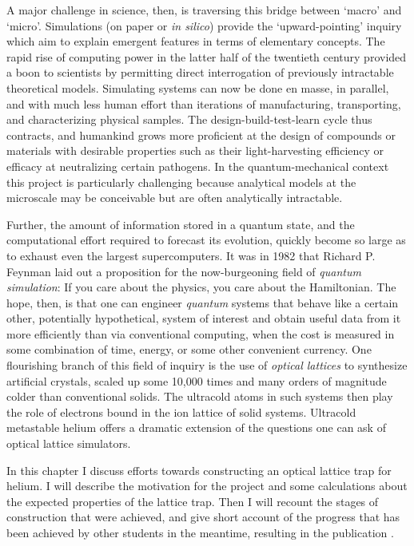 	A major challenge in science, then, is traversing this bridge between `macro' and `micro'.
	Simulations (on paper or \emph{in silico}) provide the `upward-pointing' inquiry which aim to explain emergent features in terms of elementary concepts.
	The rapid rise of computing power in the latter half of the twentieth century provided a boon to scientists by permitting direct interrogation of previously intractable theoretical models.
	Simulating systems can now be done en masse, in parallel, and with much less human effort than iterations of manufacturing, transporting, and characterizing physical samples.
	The design-build-test-learn cycle thus contracts, and humankind grows more proficient at the design of compounds or materials with desirable properties such as their light-harvesting efficiency or efficacy at neutralizing certain pathogens.
	In the quantum-mechanical context this project is particularly challenging because analytical models at the microscale may be conceivable but are often analytically intractable.
	
	Further, the amount of information stored in a quantum state, and the computational effort required to forecast its evolution, quickly become so large as to exhaust even the largest supercomputers.
	It was in 1982 that Richard P.
	Feynman laid out a proposition for the now-burgeoning field of \emph{quantum simulation}:
	If you care about the physics, you care about the Hamiltonian.
	The hope, then, is that one can engineer \emph{quantum} systems that behave like a certain other, potentially hypothetical, system of interest and obtain useful data from it more efficiently than via conventional computing, when the cost is measured in some combination of time, energy, or some other convenient currency.
	One flourishing branch of this field of inquiry is the use of \emph{optical lattices} to synthesize artificial crystals, scaled up some 10,000 times and many orders of magnitude colder than conventional solids.
	The ultracold atoms in such systems then play the role of electrons bound in the ion lattice of solid systems.
	Ultracold metastable helium offers a dramatic extension of the questions one can ask of optical lattice simulators.

	In this chapter I discuss efforts towards constructing an optical lattice trap for helium.
	I will describe the motivation for the project and some calculations about the expected properties of the lattice trap.
	Then I will recount the stages of construction that were achieved, and give short account of the progress that has been achieved by other students in the meantime, resulting in the publication \cite{Abbas21}.
	
